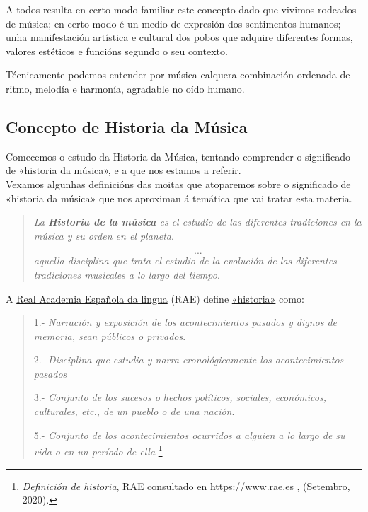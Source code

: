 \documentclass[a4paper, twoside]{templates/ociamthesis}
\begin{document}
A todos resulta en certo modo familiar este concepto dado que vivimos rodeados de música; en certo modo é un medio de expresión dos sentimentos humanos; unha manifestación artística e cultural dos pobos que adquire diferentes formas, valores estéticos e funcións segundo o seu contexto.

Técnicamente podemos entender por música calquera combinación ordenada de ritmo, melodía e harmonía, agradable no oído humano.

\hypertarget{concepto-de-historia-da-muxfasica}{%
\subsection*{Concepto de Historia da Música}\label{concepto-de-historia-da-muxfasica}}

Comecemos o estudo da Historia da Música, tentando comprender o significado de «historia da música», e a que nos estamos a referir.\\
Vexamos algunhas definicións das moitas que atoparemos sobre o significado de «historia da música» que nos aproximan á temática que vai tratar esta materia.

\begin{quote}
\emph{La \textbf{Historia de la música} es el estudio de las diferentes tradiciones en la música y su orden en el planeta}.

\[...\] \emph{aquella disciplina que trata el estudio de la evolución de las diferentes tradiciones musicales a lo largo del tiempo}.
\end{quote}

A \href{https://dle.rae.es/}{Real Academia Española da lingua} (RAE) define \href{https://dle.rae.es/historia\#otras}{«historia»} como:

\begin{quote}
1.- \emph{Narración y exposición de los acontecimientos pasados y dignos de memoria, sean públicos o privados}.

2.- \emph{Disciplina que estudia y narra cronológicamente los acontecimientos pasados}

3.- \emph{Conjunto de los sucesos o hechos políticos, sociales, económicos, culturales, etc., de un pueblo o de una nación}.

5.- \emph{Conjunto de los acontecimientos ocurridos a alguien a lo largo de su vida o en un período de ella} \footnote{\emph{Definición de historia}, RAE consultado en \url{https://www.rae.es} , (Setembro, 2020).}
\end{quote}
\end{document}
